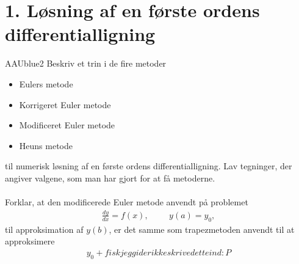 \section*{1. Løsning af en første ordens differentialligning}
% 
%
\begin{color}{AAUblue2}
%
Beskriv et trin i de fire metoder 
% 
\begin{itemize}
\item Eulers metode 
\item Korrigeret Euler metode 
\item Modificeret Euler metode 
\item Heuns metode 
\end{itemize}
% 
til numerisk løsning af en første ordens differentialligning. 
Lav tegninger, der angiver valgene, som man har gjort for at få metoderne.  
\\\\
Forklar, at den modificerede Euler metode anvendt på problemet 
%
\begin{align*}
\frac{dy}{dx} = f(x), \phantom{heeej} y(a)= y_0,
\end{align*}
% 
til approksimation af $y(b)$, er det samme som trapezmetoden anvendt til at approksimere 
%
\begin{align*}
y_0 + fisk jeg gider ikke skrive dette ind :P
\end{align*}
% 
\end{color}
% 
% 
%
